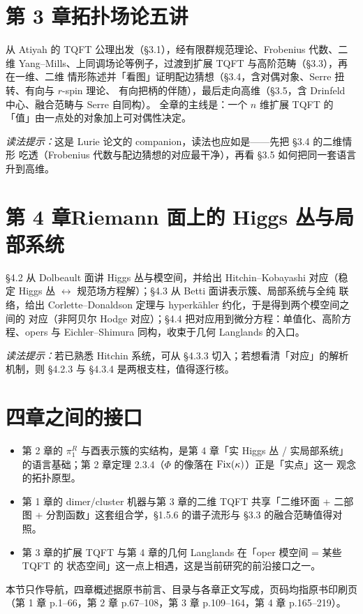 \section*{第 3 章\quad 拓扑场论五讲}

从 Atiyah 的 TQFT 公理出发（\S3.1），经有限群规范理论、Frobenius 代数、二维
Yang--Mills、上同调场论等例子，过渡到扩展 TQFT 与高阶范畴（\S3.3），再在一维、二维
情形陈述并「看图」证明配边猜想（\S3.4，含对偶对象、Serre 扭转、有向与 $r$-spin 理论、
有向把柄的伴随），最后走向高维（\S3.5，含 Drinfeld 中心、融合范畴与 Serre 自同构）。
全章的主线是：一个 $n$ 维扩展 TQFT 的「值」由一点处的对象加上可对偶性决定。

\emph{读法提示：}这是 Lurie 论文的 companion，读法也应如是——先把 \S3.4 的二维情形
吃透（Frobenius 代数与配边猜想的对应最干净），再看 \S3.5 如何把同一套语言升到高维。

\section*{第 4 章\quad Riemann 面上的 Higgs 丛与局部系统}

\S4.2 从 Dolbeault 面讲 Higgs 丛与模空间，并给出 Hitchin--Kobayashi 对应（稳定
Higgs 丛 $\leftrightarrow$ 规范场方程解）；\S4.3 从 Betti 面讲表示簇、局部系统与全纯
联络，给出 Corlette--Donaldson 定理与 hyperkähler 约化，于是得到两个模空间之间的
对应（非阿贝尔 Hodge 对应）；\S4.4 把对应用到微分方程：单值化、高阶方程、opers 与
Eichler--Shimura 同构，收束于几何 Langlands 的入口。

\emph{读法提示：}若已熟悉 Hitchin 系统，可从 \S4.3.3 切入；若想看清「对应」的解析
机制，则 \S4.2.3 与 \S4.3.4 是两根支柱，值得逐行核。

\section*{四章之间的接口}

\begin{itemize}[leftmargin=1.8em, itemsep=0.25em]
\item 第 2 章的 $\pi^R_1$ 与酉表示簇的实结构，是第 4 章「实 Higgs 丛 / 实局部系统」
      的语言基础；第 2 章定理 2.3.4（$\Phi$ 的像落在 $\operatorname{Fix}(\kappa)$）正是「实点」这一
      观念的拓扑原型。
\item 第 1 章的 dimer/cluster 机器与第 3 章的二维 TQFT 共享「二维环面 + 二部图 +
      分割函数」这套组合学，\S1.5.6 的谱子流形与 \S3.3 的融合范畴值得对照。
\item 第 3 章的扩展 TQFT 与第 4 章的几何 Langlands 在「oper 模空间 = 某些 TQFT 的
      状态空间」这一点上相遇，这是当前研究的前沿接口之一。
\end{itemize}

\begin{annote}
本节只作导航，四章概述据原书前言、目录与各章正文写成，页码均指原书印刷页
（第 1 章 p.1--66，第 2 章 p.67--108，第 3 章 p.109--164，第 4 章 p.165--219）。
\end{annote}
